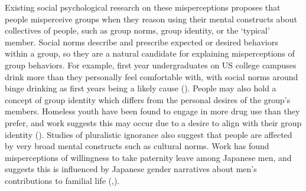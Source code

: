 Existing social psychological research on these misperceptions proposes that people misperceive groups when they reason using their mental constructs about collectives of people, such as group norms, group identity, or the `typical' member. 
Social norms describe and prescribe expected or desired behaviors within a group, so they are a natural candidate for explaining misperceptions of group behaviors.
For example, first year undergraduates on US college campuses drink more than they personally feel comfortable with, with social norms around binge drinking as first years being a likely cause (\cite{borsari_drinking_2004}).
People may also hold a concept of group identity which differs from the personal desires of the group's members. Homeless youth have been found to engage in more drug use than they prefer, and work suggests this may occur due to a desire to align with their group identity (\cite{barman-adhikari_descriptive_2017}). 
Studies of pluralistic ignorance also suggest that people are affected by very broad mental constructs such as cultural norms. 
Work has found misperceptions of willingness to take paternity leave among Japanese men, and suggests this is influenced by Japanese gender narratives about men's contributions to familial life (\cite{miyajima_i_2017},\cite{kawamura_pluralistic_2024}). 


